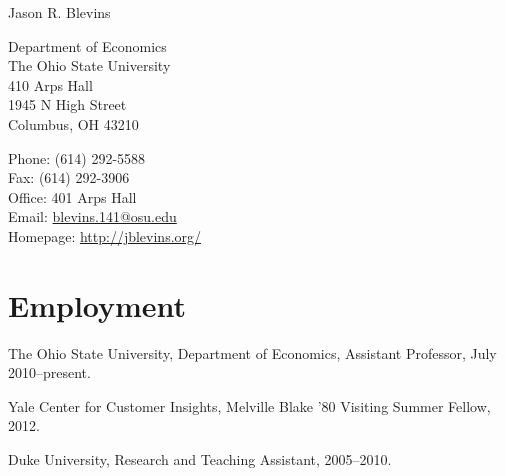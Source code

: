 \documentclass[10pt,letterpaper]{article}
\def\name{Jason R. Blevins}
\renewenvironment{itemize}{
  \begin{list}{}{
    \setlength{\leftmargin}{1.5em}
    \setlength{\itemsep}{0.25em}
    \setlength{\parskip}{0pt}
    \setlength{\parsep}{0.25em}
  }
}{
  \end{list}
}
\begin{document}
{\huge \name}


\bigskip

\begin{minipage}[t]{0.495\textwidth}
  Department of Economics \\
  The Ohio State University \\
  410 Arps Hall \\
  1945 N High Street \\
  Columbus, OH 43210
\end{minipage}
\begin{minipage}[t]{0.495\textwidth}
  Phone: (614) 292-5588 \\
  Fax: (614) 292-3906 \\
  Office: 401 Arps Hall \\
  Email: \href{mailto:blevins.141@osu.edu}{blevins.141@osu.edu} \\
  Homepage: \href{http://jblevins.org/}{http://jblevins.org/}
\end{minipage}

\section*{Employment}

\begin{itemize}
\item The Ohio State University, Department of Economics,
  Assistant Professor, July 2010--present.
\item Yale Center for Customer Insights,
  Melville Blake '80 Visiting Summer Fellow,
  2012.
\item Duke University,
  Research and Teaching Assistant,
  2005--2010.
\end{itemize}
\end{document}
